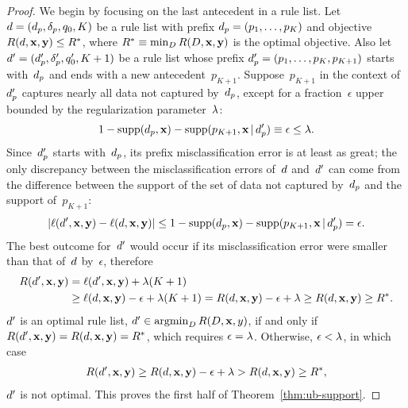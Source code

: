 \begin{arxiv}
\begin{proof}
We begin by focusing on the last antecedent in a rule list.
%
Let ${{d} = (d_p, \delta_p, q_0, K)}$
be a rule list with prefix ${d_p = (p_1, \dots, p_K)}$
and objective ${R({d}, \mathbf{x}, \mathbf{y}) \le R^*}$, where
${R^* \equiv \min_{{D}} R({D}, \mathbf{x}, \mathbf{y})}$
is the optimal objective.
%
Also let ${{d}' = (d_p', \delta_p', q_0', K + 1)}$
be a rule list whose prefix ${d_p' = (p_1, \dots, p_K, p_{K+1})}$
starts with~$d_p$ and ends with a new antecedent~$p_{K+1}$.
%
Suppose~$p_{K+1}$ in the context of~$d_p'$ captures nearly all
data not captured by~$d_p$, except for a fraction~$\epsilon$
upper bounded by the regularization parameter~${\lambda}$:
\begin{align}
1 - \textnormal{supp}(d_p, \mathbf{x}) - \textnormal{supp}(p_{K+1}, \mathbf{x} \,|\, d_p') \equiv \epsilon \le {\lambda}.
\end{align}
%
Since~$d_p'$ starts with~$d_p$,
its prefix misclassification error is at least as great;
the only discrepancy between the misclassification errors
of~${d}$ and~${d}'$ can come from the difference between the support of
the set of data not captured by~$d_p$ and the support of~$p_{K+1}$:
\begin{align}
| \ell({d}', \mathbf{x}, \mathbf{y}) - \ell({d}, \mathbf{x}, \mathbf{y}) | \le
1 - \textnormal{supp}(d_p, \mathbf{x}) - \textnormal{supp}(p_{K+1}, \mathbf{x} \,|\, d_p') = \epsilon.
\end{align}
The best outcome for~${d}'$ would occur if its misclassification
error were smaller than that of~${d}$ by~$\epsilon$,
%
therefore
\begin{align}
R({d}', \mathbf{x}, \mathbf{y}) &= \ell({d}', \mathbf{x}, \mathbf{y}) + {\lambda} (K+1) \nonumber \\
&\ge \ell({d}, \mathbf{x}, \mathbf{y}) - \epsilon + {\lambda}(K+1)
= R({d}, \mathbf{x}, \mathbf{y}) - \epsilon + {\lambda} \ge R({d}, \mathbf{x}, \mathbf{y}) \ge R^*.
\end{align}
${d}'$ is an optimal rule list,
\ie ${{d}' \in \operatorname*{argmin}_{{D}} R({D}, \mathbf{x}, y)}$,
if and only if ${R({d}', \mathbf{x}, \mathbf{y}) = R({d}, \mathbf{x}, \mathbf{y}) = R^*}$,
which requires ${\epsilon = {\lambda}}$.
%
Otherwise, ${\epsilon < {\lambda}}$, in which case
\begin{align}
R({d}', \mathbf{x}, \mathbf{y}) \ge R({d}, \mathbf{x}, \mathbf{y}) - \epsilon + {\lambda}
> R({d}, \mathbf{x}, \mathbf{y}) \ge R^*,
\end{align}
\ie ${d}'$ is not optimal.
%
This proves the first half of Theorem~\ref{thm:ub-support}.


\end{proof}
\end{arxiv}
